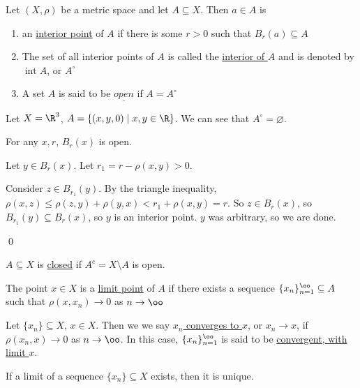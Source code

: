 \documentclass[x11names,reqno,14pt]{extarticle}
\newcommand{\seq}[2][\oo]{_{#2 = 1}^#1}
\begin{document}

Let $(X, \rho)$ be a metric space and let $A \subseteq X$. Then $a \in A$ is

\begin{enumerate}[label=(\roman*)]

\item an \underline{interior point} of $A$ if there is some $r>0$ such that $B_r(a) \subseteq A$

\item The set of all interior points of $A$ is called the \underline{interior of $A$} and is denoted by $\operatorname{int} A$, or $A^\circ$

\item A set $A$ is said to be $\underline{open}$ if $A = A^\circ$

\end{enumerate}

\exm

Let $X = \R^3$, $A = \{(x, y, 0) \mid x, y \in \R\}$. We can see that $A^\circ = \varnothing$.

\prop

For any $x, r$, $B_r(x)$ is open.

\proof

Let $y \in B_r(x)$. Let $r_1 = r - \rho(x, y) > 0$. 

Consider $z \in B_{r_1}(y)$. By the triangle inequality, $\rho(x, z) \leq \rho(z, y) + \rho(y, x) < r_1 + \rho(x, y) = r$. So $z \in B_r(x)$, so $B_{r_1}(y) \subseteq B_r(x)$, so $y$ is an interior point. $y$ was arbitrary, so we are done.

\qed


$A \subseteq X$ is \underline{closed} if $A^c = X\setminus A$ is open.


The point $x \in X$ is a \underline{limit point} of $A$ if there exists a sequence $\{x_n\}\seq{n} \subseteq A$ such that $\rho(x, x_n)\to0$ as $n\to\oo$


Let $\{x_n\}\subseteq X$, $x \in X$. Then we we say \underline{$x_n$ converges to $x$}, or $x_n\to x$, if $\rho(x_n, x)\to0$ as $n\to\oo$. In this case, $\{x_n\}\seq{n}$ is said to be \underline{convergent, with limit $x$}.

\thm

If a limit of a sequence $\{x_n\}\subseteq X$ exists, then it is unique. 

\proof
\end{document}
